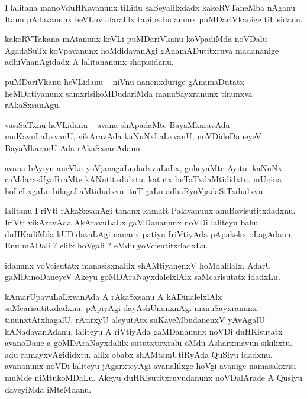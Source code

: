 \documentclass{article}
\begin{document}
\begin{mn}%
I lalitana manoVduHKavanunx tiLidu saBeyalilxdadx kakoRVTaneMba nAganu Itanu pAdavanunx 
heVLuvudaralilx tapipxdudanunx puMDariVkanige tiLisidanu.
\end{mn}

\begin{mn}%
kakoRVTakana mAtanunx keVLi puMDariVkanu koVpadiMda noVDalu AgadaSuTx koVpavanunx hoMdidavanAgi 
gAnamADutitxruva madananige adhiVnanAgidadx A lalitananunx shapisidanu.
\end{mn}

\begin{mn}%
puMDariVkanu heVLidanu -- niVnu nanenxdurige gAnamaDutatx heMDatiyanunx samxrisikoMDudariMda 
manuSayxranunx tinunxva rAkaSxsanAgu.
\end{mn}

\begin{mn}%
vasiSaTxnu heVLidanu -- avana shApadaMte BayaMkaravAda muKavuLaLxvanU, vikAravAda kaNuNxLaLxvanU, 
noVDidoDaneyeV BayaMkaranU Ada rAkaSxsanAdanu.
\end{mn}

\begin{mn}%
avana bAyiyu aneVka yoVjanagaLudadxvuLaLx, guheyaMte Ayitu. kaNuNx caMdarxsUyaRraMte 
kANutitxdidxtu. katutx beTaTxdaMtididxtu. mUgina hoLeLxgaLu bilagaLaMtidudxvu. tuTigaLu 
adhaRyoVjadaSiTxdudxvu.
\end{mn}

\begin{mn}%
lalitanu I riVti rAkaSxsanAgi tananx kamaR Palavanunx anuBavisutitxdadxnu. IriVti vikAravAda 
AkAravuLaLx gaMDananunx noVDi laliteyu bahu duHKadiMda kUDidavaLAgi nananx patiyu IriVtiyAda 
pApakekx oLagAdanu. Enu mADali ? elilx hoVgali ? eMdu yoVcisutitxdadxLu.
\end{mn}

\begin{mn}%
idanunx yoVcisutatx manasisxnalilx shAMtiyanenxV hoMdalilalx. AdarU gaMDanoDaneyeV Akeyu 
goMDAraNayxdalelxlAlx saMcarisutatx idadxLu.
\end{mn}

\begin{mn}%
kAmarUpavuLaLxvanAda A rAkaSxsanu A kADinalelxlAlx saMcarisutitxdadxnu. pApiyAgi dayAshUnanxnAgi 
manuSayxranunx tinunxtAtxhagalU, rAtirxyU aleyutAtx suKaveMbudanenxV yAvAgalU kANadavanAdanu. 
laliteyu A riVtiyAda gaMDananunx noVDi duHKisutatx avanoDane a goMDAraNayxdalilx sututxtirxralu 
oMdu Asharxmavun sikikxtu. adu ramayxvAgididxtu. alilx obabx shAMtamUtiRyAda QuSiyu idadxnu. 
avananunx noVDi laliteyu jAgarxteyAgi avanalilxge hoVgi avanige namasakxrisi muMde niMtukoMDaLu. 
Akeyu duHKisutitxruvudanunx noVDalArade A Qusiyu dayeyiMda iMteMdanu.
\end{mn}
\end{document}
